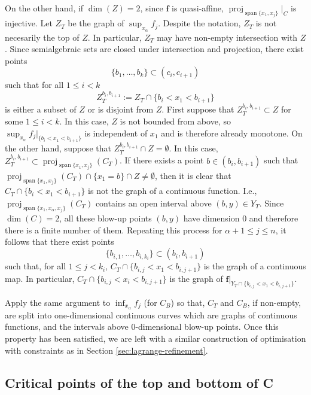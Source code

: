\documentclass[
]{book}
\theoremstyle{definition}
\theoremstyle{definition}
\theoremstyle{definition}
\theoremstyle{definition}
\theoremstyle{remark}
\begin{document}
On the other hand, if \(\dim(Z) = 2\), since \(\mathbf{f}\) is quasi-affine, \({\operatorname{proj}_{{\operatorname{span} \{x_1,x_j\}}}}\vert_C\) is injective.
Let \(Z_T\) be the graph of \(\sup_{x_\alpha} f_j\). Despite the notation, \(Z_T\) is not necesarily the top of \(Z\). In particular, \(Z_T\) may have non-empty intersection with \(Z\).
Since semialgebraic sets are closed under intersection and projection, there exist points
\[\{b_1,\ldots,b_k\} \subset (c_i,c_{i+1})
\] such that for all \(1 \le i < k\) \[
Z^{b_i,b_{i+1}}_T := Z_T \cap \{ b_i < x_1 < b_{i+1} \}
\]
is either a subset of \(Z\) or is disjoint from \(Z\).
First suppose that \(Z^{b_i,b_{i+1}}_T \subset Z\) for some \(1 \le i < k\).
In this case, \(Z\) is not bounded from above, so \(\sup_{x_\alpha} f_j \vert_{\{ b_i < x_1 < b_{i+1} \}}\) is independent of \(x_1\) and is therefore already monotone.
On the other hand, suppose that \(Z^{b_i,b_{i+1}}_T \cap Z = \emptyset\).
In this case, \(Z^{b_i,b_{i+1}}_T \subset {\operatorname{proj}_{{\operatorname{span} \{x_1,x_j\}}}}(C_T)\).
If there exists a point \(b \in (b_i,b_{i+1})\) such that \({\operatorname{proj}_{{\operatorname{span} \{x_1,x_j\}}}}(C_T) \cap \{x_1 = b\} \cap Z \neq \emptyset\),
then it is clear that \(C_T \cap \{ b_i < x_1 < b_{i+1} \}\) is not the graph of a continuous function.
I.e., \({\operatorname{proj}_{{\operatorname{span} \{x_1,x_\alpha,x_j\}}}}(C_T)\) contains an open interval above \((b,y) \in Y_T\).
Since \(\dim(C) = 2\), all these blow-up points \((b,y)\) have dimension \(0\) and therefore there is a finite number of them. Repeating this process for \(\alpha + 1 \le j \le n\), it follows that there exist points
\[\{ b_{i,1}, \ldots, b_{i,k_i} \} \subset (b_i, b_{i+1})
\] such that, for all \(1 \le j < k_i\), \(C_T \cap \{ b_{i,j} < x_1 < b_{i,j+1} \}\) is the graph of a continuous map.
In particular, \(C_T \cap \{ b_{i,j} < x_i < b_{i,j+1} \}\) is the graph of \(\mathbf{f}\vert_{Y_T \cap \{ b_{i,j} < x_1 < b_{i,j+1} \}}\).

Apply the same argument to \(\inf_{x_\alpha} f_j\) (for \(C_B\)) so that, \(C_T\) and \(C_B\), if non-empty, are split into one-dimensional continuous curves which are graphs of continuous functions, and the intervals above \(0\)-dimensional blow-up points. Once this property has been satisfied, we are left with a similar construction of optimisation with constraints as in Section \ref{sec:lagrange-refinement}.

\hypertarget{critical-points-of-the-top-and-bottom-of-c}{%
\subsection{Critical points of the top and bottom of C}\label{critical-points-of-the-top-and-bottom-of-c}}
\end{document}
